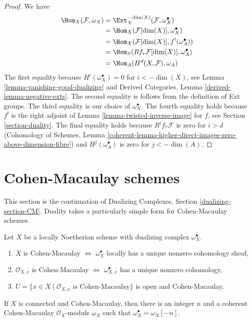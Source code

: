 \begin{proof}
We have
\begin{align*}
\Hom_X(\mathcal{F}, \omega_X)
& =
\Ext^{-\dim(X)}_X(\mathcal{F}, \omega_X^\bullet) \\
& =
\Hom_X(\mathcal{F}[\dim(X)], \omega_X^\bullet) \\
& =
\Hom_X(\mathcal{F}[\dim(X)], f^!(\omega_A^\bullet)) \\
& =
\Hom_S(Rf_*\mathcal{F}[\dim(X)], \omega_A^\bullet) \\
& =
\Hom_A(H^d(X, \mathcal{F}), \omega_A)
\end{align*}
The first equality because $H^i(\omega_X^\bullet) = 0$ for
$i < -\dim(X)$, see Lemma \ref{lemma-vanishing-good-dualizing} and
Derived Categories, Lemma \ref{derived-lemma-negative-exts}.
The second equality is follows from the definition of Ext groups.
The third equality is our choice of $\omega_X^\bullet$.
The fourth equality holds because $f^!$ is the
right adjoint of Lemma \ref{lemma-twisted-inverse-image} for
$f$, see Section \ref{section-duality}.
The final equality holds because $R^if_*\mathcal{F}$ is zero
for $i > d$ (Cohomology of Schemes, Lemma
\ref{coherent-lemma-higher-direct-images-zero-above-dimension-fibre})
and $H^j(\omega_A^\bullet)$ is zero for $j < -\dim(A)$.
\end{proof}








\section{Cohen-Macaulay schemes}
\label{section-CM}

\noindent
This section is the continuation of Dualizing Complexes, Section
\ref{dualizing-section-CM}.
Duality takes a particularly simple form for Cohen-Macaulay schemes.

\begin{lemma}
\label{lemma-dualizing-module-CM-scheme}
Let $X$ be a locally Noetherian scheme with dualizing complex
$\omega_X^\bullet$.
\begin{enumerate}
\item $X$ is Cohen-Macaulay $\Leftrightarrow$ $\omega_X^\bullet$
locally has a unique nonzero cohomology sheaf,
\item $\mathcal{O}_{X, x}$ is Cohen-Macaulay $\Leftrightarrow$
$\omega_{X, x}^\bullet$ has a unique nonzero cohomology,
\item $U = \{x \in X \mid \mathcal{O}_{X, x}\text{ is Cohen-Macaulay}\}$
is open and Cohen-Macaulay.
\end{enumerate}
If $X$ is connected and Cohen-Macaulay, then there is an integer $n$
and a coherent Cohen-Macaulay $\mathcal{O}_X$-module $\omega_X$
such that $\omega_X^\bullet = \omega_X[-n]$.
\end{lemma}

